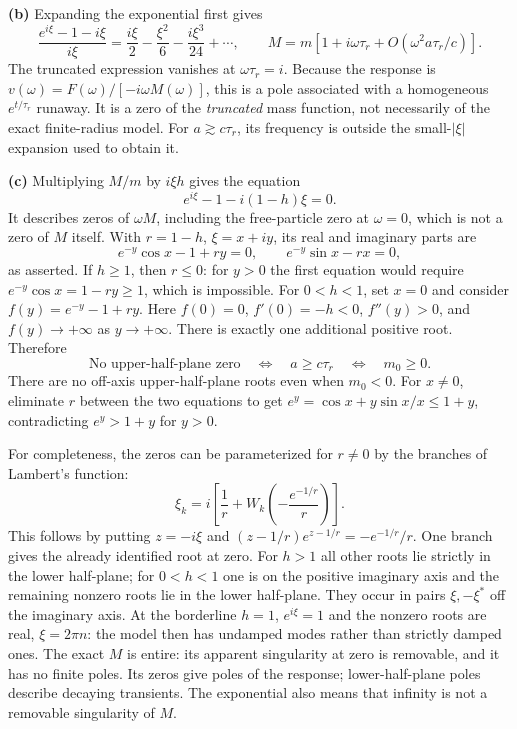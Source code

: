 \textbf{(b)} Expanding the exponential first gives
\[
\frac{e^{i\xi}-1-i\xi}{i\xi}
=\frac{i\xi}{2}-\frac{\xi^2}{6}-\frac{i\xi^3}{24}+\cdots,
\qquad M=m[1+i\omega\tau_r+O(\omega^2a\tau_r/c)].
\]
The truncated expression vanishes at $\omega\tau_r=i$.
Because the response is $v(\omega)=F(\omega)/[-i\omega M(\omega)]$,
this is a pole associated with a homogeneous $e^{t/\tau_r}$ runaway.
It is a zero of the \emph{truncated} mass function, not necessarily of
the exact finite-radius model. For $a\gtrsim c\tau_r$, its frequency
is outside the small-$|\xi|$ expansion used to obtain it.

\textbf{(c)} Multiplying $M/m$ by $i\xi h$ gives the equation
\[
e^{i\xi}-1-i(1-h)\xi=0.
\]
It describes zeros of $\omega M$, including the free-particle zero
at $\omega=0$, which is not a zero of $M$ itself.
With $r=1-h$, $\xi=x+iy$, its real and imaginary parts are
\[
e^{-y}\cos x-1+ry=0,\qquad e^{-y}\sin x-rx=0,
\]
as asserted. If $h\ge1$, then $r\le0$: for $y>0$ the first equation
would require $e^{-y}\cos x=1-ry\ge1$, which is impossible.
For $0<h<1$, set $x=0$ and consider
$f(y)=e^{-y}-1+ry$. Here $f(0)=0$, $f'(0)=-h<0$,
$f''(y)>0$, and $f(y)\to+\infty$ as $y\to+\infty$.
There is exactly one additional positive root. Therefore
\[
\boxed{\text{No upper-half-plane zero}\quad\Longleftrightarrow\quad
 a\ge c\tau_r\quad\Longleftrightarrow\quad m_0\ge0.}
\]
There are no off-axis upper-half-plane roots even when $m_0<0$.
For $x\ne0$, eliminate $r$ between the two equations to get
$e^y=\cos x+y\sin x/x\le1+y$, contradicting $e^y>1+y$ for $y>0$.

For completeness, the zeros can be parameterized for $r\ne0$ by the
branches of Lambert's function:
\[
\xi_k=i\left[\frac1r+W_k\!\left(-\frac{e^{-1/r}}r\right)\right].
\]
This follows by putting $z=-i\xi$ and
$(z-1/r)e^{z-1/r}=-e^{-1/r}/r$.
One branch gives the already identified root at zero.
For $h>1$ all other roots lie strictly in the lower half-plane;
for $0<h<1$ one is on the positive imaginary axis and the remaining
nonzero roots lie in the lower half-plane. They occur in pairs
$\xi,-\xi^*$ off the imaginary axis. At the borderline $h=1$,
$e^{i\xi}=1$ and the nonzero roots are real, $\xi=2\pi n$:
the model then has undamped modes rather than strictly damped ones.
The exact $M$ is entire: its apparent singularity at zero is removable,
and it has no finite poles. Its zeros give poles of the response;
lower-half-plane poles describe decaying transients. The exponential
also means that infinity is not a removable singularity of $M$.

